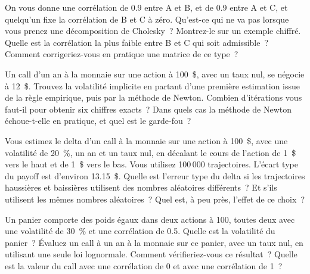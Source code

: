 \begin{question}\label{iq:iv2:pricing-and-numerics:28}
On vous donne une corrélation de 0.9 entre A et B, et de 0.9 entre A et C, et quelqu'un fixe la corrélation de B et C à zéro. Qu'est-ce qui ne va pas lorsque vous prenez une décomposition de Cholesky~? Montrez-le sur un exemple chiffré. Quelle est la corrélation la plus faible entre B et C qui soit admissible~? Comment corrigeriez-vous en pratique une matrice de ce type~?
\end{question}

\begin{question}\label{iq:iv2:pricing-and-numerics:29}
Un call d'un an à la monnaie sur une action à 100~\$, avec un taux nul, se négocie à 12~\$. Trouvez la volatilité implicite en partant d'une première estimation issue de la règle empirique, puis par la méthode de Newton. Combien d'itérations vous faut-il pour obtenir six chiffres exacts~? Dans quels cas la méthode de Newton échoue-t-elle en pratique, et quel est le garde-fou~?
\end{question}

\begin{question}\label{iq:iv2:pricing-and-numerics:30}
Vous estimez le delta d'un call à la monnaie sur une action à 100~\$, avec une volatilité de 20~\%, un an et un taux nul, en décalant le cours de l'action de 1~\$ vers le haut et de 1~\$ vers le bas. Vous utilisez 100\,000 trajectoires. L'écart type du payoff est d'environ 13.15~\$. Quelle est l'erreur type du delta si les trajectoires haussières et baissières utilisent des nombres aléatoires différents~? Et s'ils utilisent les mêmes nombres aléatoires~? Quel est, à peu près, l'effet de ce choix~?
\end{question}

\begin{question}\label{iq:iv2:pricing-and-numerics:31}
Un panier comporte des poids égaux dans deux actions à 100, toutes deux avec une volatilité de 30~\% et une corrélation de 0.5. Quelle est la volatilité du panier~? Évaluez un call à un an à la monnaie sur ce panier, avec un taux nul, en utilisant une seule loi lognormale. Comment vérifieriez-vous ce résultat~? Quelle est la valeur du call avec une corrélation de 0 et avec une corrélation de 1~?
\end{question}

